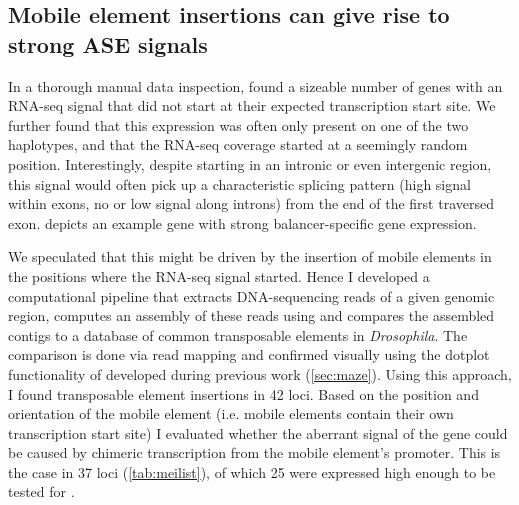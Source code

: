 \subsection{Mobile element insertions can give rise to strong ASE signals}
\label{sec:balancer_ase_mei}


In a thorough manual data inspection, \yad found a sizeable number of genes with
an RNA-seq signal that did not start at their expected transcription start site.
We further found that this expression was often only present on one of the two
haplotypes, and that the RNA-seq coverage started at a seemingly random
position. Interestingly, despite starting in an intronic or even intergenic
region, this signal would often pick up a characteristic splicing pattern
(high signal within exons, no or low signal along introns) from the end of the
first traversed exon.  depicts an example gene
with strong balancer-specific gene expression.

We speculated that this might be driven by the insertion of mobile elements in
the positions where the RNA-seq signal started. Hence I developed a computational
pipeline that extracts DNA-sequencing reads of a given genomic region,
computes an assembly of these reads using \spades and compares the assembled
contigs to a database of common transposable elements in \textit{Drosophila}.
The comparison is done via read mapping and confirmed visually using the dotplot
functionality of \maze developed during previous work (\cref{sec:maze}). Using this
approach, I found transposable element insertions in 42 loci. Based on the
position and orientation of the mobile element (i.e. mobile elements contain
their own transcription start site) I evaluated whether the aberrant \ase
signal of the gene could be caused by chimeric transcription from the mobile
element’s promoter. This is the case in 37 loci (\cref{tab:meilist}),
of which 25 were expressed high enough to be tested for \ase.

